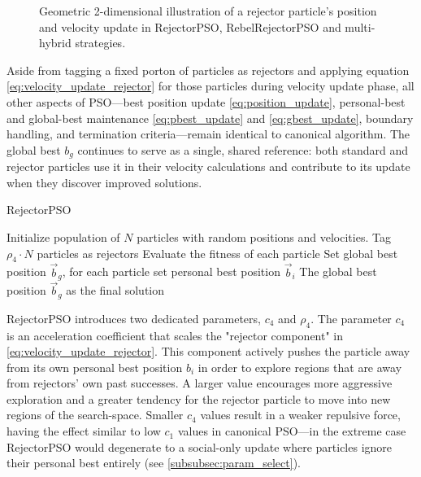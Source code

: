 {\begin{figure}[H]
\begin{tikzpicture}
    \end{tikzpicture}
    \caption[Geometric illustration of rejector particle's position and velocity update]{Geometric 2-dimensional illustration of a rejector particle's position and velocity update in RejectorPSO, RebelRejectorPSO and multi-hybrid strategies.}
    \label{fig:RejectorPSO_geometric_illustration}
\end{figure}

Aside from tagging 
a fixed porton of particles as rejectors and applying equation \eqref{eq:velocity_update_rejector} for those particles during velocity update phase, all other aspects of PSO---best position update \eqref{eq:position_update}, personal-best and global-best maintenance \eqref{eq:pbest_update} and \eqref{eq:gbest_update}, boundary handling, and termination criteria---remain identical to canonical algorithm. The global best 
$b_g$ continues to serve as a single, shared reference: both standard and rejector particles use it in their velocity calculations and contribute to its update when they discover improved solutions. 

\vspace{.935em}
\begin{algorithm}[H]
\caption{RejectorPSO}\label{alg:rejector}
Initialize population of \(N\) particles with random positions and velocities. Tag \(\rho_4 \cdot N\) particles as rejectors\;
Evaluate the fitness of each particle\;
Set global best position \(\vec{b}_g\), for each particle set personal best position \(\vec{b}_i\)\;
\Return The global best position \(\vec{b}_g\) as the final solution\;
\end{algorithm}
\vspace{.935em}

RejectorPSO introduces two dedicated parameters, $c_4$ and $\rho_4$. The parameter $c_4$ is an acceleration coefficient that scales the "rejector component" in \eqref{eq:velocity_update_rejector}. This component actively pushes the particle away from its own personal best position $b_i$ in order to explore regions that are away from rejectors' own past successes.
A larger value encourages more aggressive exploration and a greater tendency for the rejector particle to move into new regions of the \gls{search-space}. Smaller $c_4$ values result in a weaker repulsive force, having the effect similar to low $c_1$ values in canonical PSO---in the extreme case RejectorPSO would degenerate to a social\-\mbox{-only} update where particles ignore their personal best entirely (see \autoref{subsubsec:param_select}).

}
